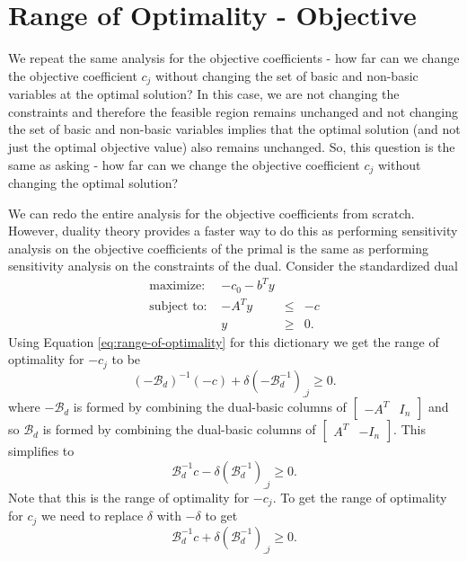 \documentclass[
]{book}
\theoremstyle{definition}
\theoremstyle{definition}
\theoremstyle{definition}
\theoremstyle{definition}
\theoremstyle{remark}
\begin{document}
\hypertarget{range-of-optimality---objective}{%
\section{Range of Optimality - Objective}\label{range-of-optimality---objective}}

We repeat the same analysis for the objective coefficients - how far can we change the objective
coefficient \(c_j\) without changing the set of basic and non-basic variables at the optimal solution?
In this case, we are not changing the constraints and therefore the feasible region remains
unchanged and not changing the set of basic and non-basic variables implies that the optimal solution (and
not just the optimal objective value) also remains unchanged. So, this question is the same as
asking - how far can we change the objective coefficient \(c_j\) without changing the optimal
solution?

We can redo the entire analysis for the objective coefficients from scratch. However, duality theory
provides a faster way to do this as performing sensitivity analysis on the objective coefficients of
the primal is the same as performing sensitivity analysis on the constraints of the dual.
Consider the standardized dual
\begin{equation*}
  \begin{array}{lrll}
    \mbox{maximize: } & -c_0 -b^T y \\
    \mbox{subject to: } 
      & -A^T y & \leq & -c \\
      & y & \geq & 0.
  \end{array}
\end{equation*}
Using Equation \eqref{eq:range-of-optimality} for this dictionary we get the range of optimality for \(-c_j\) to be
\begin{equation}
  (-\mathcal{B}_d)^{-1} (-c) + \delta (-\mathcal{B}_d^{-1})_{\_j} \ge 0.
\end{equation}
where \(-\mathcal{B}_d\) is formed by combining the dual-basic columns of \(\begin{bmatrix} -A^T & I_n\end{bmatrix}\) and so \(\mathcal{B}_d\) is formed by combining the dual-basic columns of
\(\begin{bmatrix} A^T & -I_n\end{bmatrix}\). This simplifies to
\begin{equation}
  \mathcal{B}_d^{-1} c - \delta (\mathcal{B}_d^{-1})_{\_j} \ge 0.
\end{equation}
Note that this is the range of optimality for \(-c_j\). To get the range of optimality for \(c_j\) we
need to replace \(\delta\) with \(-\delta\) to get
\begin{equation}
  \mathcal{B}_d^{-1} c + \delta (\mathcal{B}_d^{-1})_{\_j} \ge 0.
\end{equation}
\end{document}
